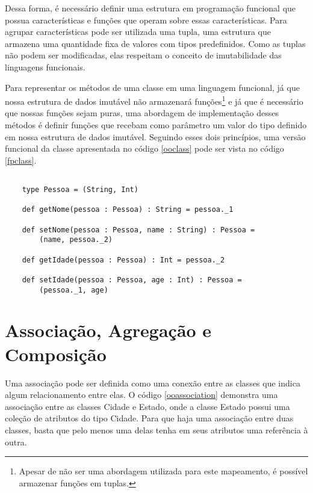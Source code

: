 Dessa forma, é necessário definir uma estrutura em 
programação funcional que possua características e 
funções que operam sobre essas características. 
Para agrupar características pode ser utilizada uma 
tupla, uma estrutura que armazena uma quantidade 
fixa de valores com tipos predefinidos\cite{tuplesscala}. 
Como as tuplas não podem ser modificadas, elas 
respeitam o conceito de imutabilidade das 
linguagens funcionais.

Para representar os métodos de uma classe em uma 
linguagem funcional, já que nossa estrutura de dados 
imutável não armazenará funções\footnote{Apesar de não 
ser uma abordagem utilizada para este mapeamento, é 
possível armazenar funções em tuplas.} e já 
que é necessário que nossas funções sejam puras, 
uma abordagem de implementação desses 
métodos é definir funções que recebam 
como parâmetro um valor do tipo definido em nossa 
estrutura de dados imutável. Seguindo esses dois 
princípios, uma versão funcional da classe apresentada 
no código \ref{ooclass} pode ser vista no código \ref{fpclass}.


\begin{lstlisting}[caption={Representação de uma classe no contexto funcional},label=fpclass]
    
    type Pessoa = (String, Int)

    def getNome(pessoa : Pessoa) : String = pessoa._1 

    def setNome(pessoa : Pessoa, name : String) : Pessoa = 
        (name, pessoa._2)

    def getIdade(pessoa : Pessoa) : Int = pessoa._2

    def setIdade(pessoa : Pessoa, age : Int) : Pessoa =
        (pessoa._1, age)

\end{lstlisting}

\section{Associação, Agregação e Composição}

Uma associação pode ser definida como uma 
conexão entre as classes que indica algum 
relacionamento entre elas\cite{Sommerville10}. 
O código \ref{ooassociation} demonstra uma 
associação entre as classes Cidade e Estado, onde 
a classe Estado possui uma coleção de atributos 
do tipo Cidade. Para que haja uma associação 
entre duas classes, basta que pelo menos 
uma delas tenha em seus atributos uma 
referência à outra.

